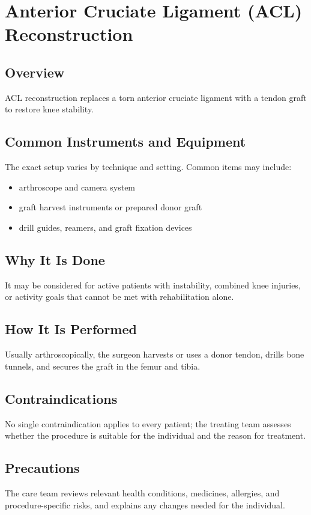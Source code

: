 \chapter{Anterior Cruciate Ligament (ACL) Reconstruction}
\section*{Overview}
ACL reconstruction replaces a torn anterior cruciate ligament with a tendon graft to restore knee stability.
\section*{Common Instruments and Equipment}
The exact setup varies by technique and setting. Common items may include:
\begin{itemize}[nosep,leftmargin=*]
  \item arthroscope and camera system
  \item graft harvest instruments or prepared donor graft
  \item drill guides, reamers, and graft fixation devices
\end{itemize}

\section*{Why It Is Done}
It may be considered for active patients with instability, combined knee injuries, or activity goals that cannot be met with rehabilitation alone.
\section*{How It Is Performed}
Usually arthroscopically, the surgeon harvests or uses a donor tendon, drills bone tunnels, and secures the graft in the femur and tibia.
\section*{Contraindications}
No single contraindication applies to every patient; the treating team assesses whether the procedure is suitable for the individual and the reason for treatment.

\section*{Precautions}
The care team reviews relevant health conditions, medicines, allergies, and procedure-specific risks, and explains any changes needed for the individual.

